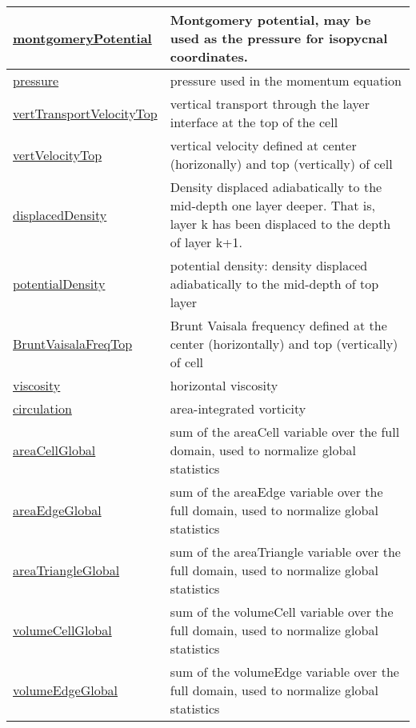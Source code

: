 {\begin{center}
\begin{longtable}{| p{2.0in} | p{4.0in} |}
	\hline
	\hyperref[subsec:var_sec_state_montgomeryPotential]{montgomeryPotential} & Montgomery potential, may be used as the pressure for isopycnal coordinates. \\
	\hline
	\hyperref[subsec:var_sec_state_pressure]{pressure} & pressure used in the momentum equation \\
	\hline
	\hyperref[subsec:var_sec_state_vertTransportVelocityTop]{vertTransportVelocityTop} & vertical transport through the layer interface at the top of the cell \\
	\hline
	\hyperref[subsec:var_sec_state_vertVelocityTop]{vertVelocityTop} & vertical velocity defined at center (horizonally) and top (vertically) of cell \\
	\hline
	\hyperref[subsec:var_sec_state_displacedDensity]{displacedDensity} & Density displaced adiabatically to the mid-depth one layer deeper.  That is, layer k has been displaced to the depth of layer k+1. \\
	\hline
	\hyperref[subsec:var_sec_state_potentialDensity]{potentialDensity} & potential density: density displaced adiabatically to the mid-depth of top layer \\
	\hline
	\hyperref[subsec:var_sec_state_BruntVaisalaFreqTop]{BruntVaisalaFreqTop} & Brunt Vaisala frequency defined at the center (horizontally) and top (vertically) of cell \\
	\hline
	\hyperref[subsec:var_sec_state_viscosity]{viscosity} & horizontal viscosity \\
	\hline
	\hyperref[subsec:var_sec_state_circulation]{circulation} & area-integrated vorticity \\
	\hline
	\hyperref[subsec:var_sec_state_areaCellGlobal]{areaCellGlobal} & sum of the areaCell variable over the full domain, used to normalize global statistics \\
	\hline
	\hyperref[subsec:var_sec_state_areaEdgeGlobal]{areaEdgeGlobal} & sum of the areaEdge variable over the full domain, used to normalize global statistics \\
	\hline
	\hyperref[subsec:var_sec_state_areaTriangleGlobal]{areaTriangleGlobal} & sum of the areaTriangle variable over the full domain, used to normalize global statistics \\
	\hline
	\hyperref[subsec:var_sec_state_volumeCellGlobal]{volumeCellGlobal} & sum of the volumeCell variable over the full domain, used to normalize global statistics \\
	\hline
	\hyperref[subsec:var_sec_state_volumeEdgeGlobal]{volumeEdgeGlobal} & sum of the volumeEdge variable over the full domain, used to normalize global statistics \\

\end{longtable}
\end{center}}
